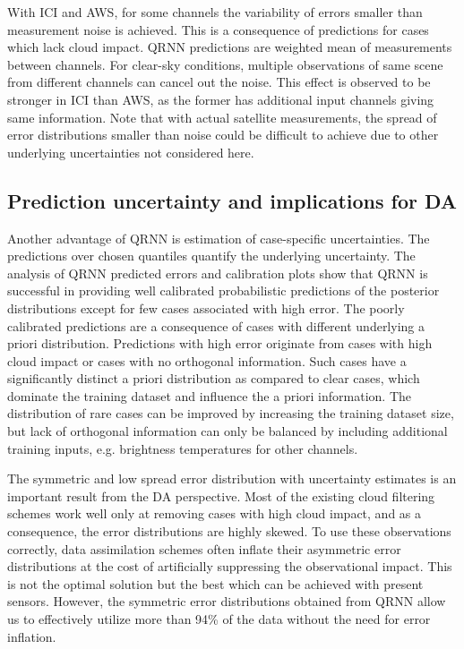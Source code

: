 \documentclass[amt, manuscript]{copernicus}
\begin{document}
With ICI and AWS, for some channels the variability of errors smaller than measurement noise is achieved. This is a consequence of predictions for cases which lack cloud impact. QRNN predictions are weighted mean of measurements between channels. For clear-sky conditions, multiple observations of same scene from different channels can cancel out the noise. This effect is observed to be stronger in ICI than AWS, as the former has additional input channels giving same information. Note that with actual satellite measurements, the spread of error distributions smaller than noise could be difficult to achieve due to other underlying uncertainties not considered here. 


\subsection{Prediction uncertainty and implications for DA}

Another advantage of QRNN is estimation of case-specific uncertainties. The predictions over chosen quantiles quantify the underlying uncertainty. The analysis of QRNN predicted errors and calibration plots show that QRNN is successful in providing well calibrated probabilistic predictions of the posterior distributions except for few cases associated with high error. The poorly calibrated predictions are a consequence of cases with different underlying a priori distribution. Predictions with high error originate from cases with high cloud impact or cases with no orthogonal information. Such cases have a significantly distinct a priori distribution as compared to clear cases, which dominate the training dataset and influence the a priori information. The distribution of rare cases can be improved by increasing the training dataset size, but lack of orthogonal information can only be balanced by including additional training inputs, e.g. brightness temperatures for other channels. 

The symmetric and low spread error distribution with uncertainty estimates is an important result from the DA perspective. Most of the existing cloud filtering schemes work well only at removing cases with high cloud impact, and as a consequence, the error distributions are highly skewed. To use these observations correctly, data assimilation schemes often inflate their asymmetric error distributions at the cost of artificially suppressing the observational impact. This is not the optimal solution but the best which can be achieved with present sensors. However, the symmetric error distributions obtained from QRNN allow us to effectively utilize more than 94\% of the data without the need for error inflation. 
\end{document}
